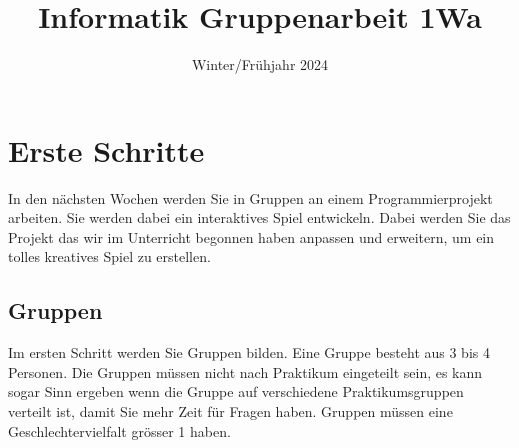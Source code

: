 \documentclass[11pt,a4paper]{report}
\title{Informatik Gruppenarbeit 1Wa}
\date{Winter/Frühjahr 2024}
\begin{document}
\maketitle

\newpage
\section{Erste Schritte}

In den nächsten Wochen werden Sie in Gruppen an einem Programmierprojekt
arbeiten. Sie werden dabei ein interaktives Spiel entwickeln. Dabei werden Sie
das Projekt das wir im Unterricht begonnen haben anpassen und erweitern, um ein
tolles kreatives Spiel zu erstellen.

\subsection{Gruppen}

Im ersten Schritt werden Sie Gruppen bilden. Eine Gruppe besteht aus 3 bis 4
Personen. Die Gruppen müssen nicht nach Praktikum eingeteilt sein, es kann
sogar Sinn ergeben wenn die Gruppe auf verschiedene Praktikumsgruppen verteilt
ist, damit Sie mehr Zeit für Fragen haben. Gruppen müssen eine Geschlechtervielfalt grösser 1 haben.





\end{document}
